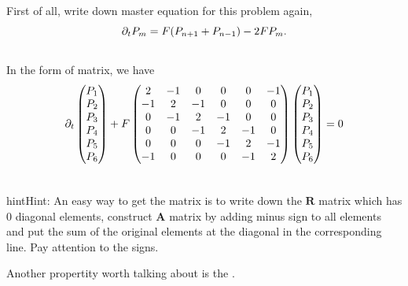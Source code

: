 \documentclass[letterpaper,10pt,english]{sphinxmanual}
\begin{document}
First of all, write down master equation for this problem again,
\begin{gather}
\begin{split}\partial_t P_m = F(P_{n+1} + P_{n-1}) -2F P_m .\end{split}\notag\\\begin{split}\end{split}\notag
\end{gather}
In the form of matrix, we have
\begin{gather}
\begin{split}\partial_t \begin{pmatrix} P_1 \\ P_2 \\ P_3 \\ P_4 \\ P_5 \\ P_6 \end{pmatrix} + F \begin{pmatrix}  2 & -1 & 0 & 0 & 0 & -1 \\ -1 & 2 & -1 & 0 & 0 & 0 \\0 & -1 & 2 & -1 & 0 & 0 \\ 0 & 0 & -1 & 2 & -1 & 0 \\ 0 & 0 & 0 & -1 & 2 & -1 \\ -1 & 0 & 0 & 0 & -1 & 2 \end{pmatrix} \begin{pmatrix} P_1 \\ P_2 \\ P_3 \\ P_4 \\ P_5 \\ P_6 \end{pmatrix} = 0\end{split}\notag\\\begin{split}\end{split}\notag
\end{gather}
\begin{notice}{hint}{Hint:}
An easy way to get the matrix is to write down the $\mathbf R$ matrix which has 0 diagonal elements, construct $\mathbf A$ matrix by adding minus sign to all elements and put the sum of the original elements at the diagonal in the corresponding line. Pay attention to the signs.

Another propertity worth talking about is the . 
\end{notice}
\end{document}
